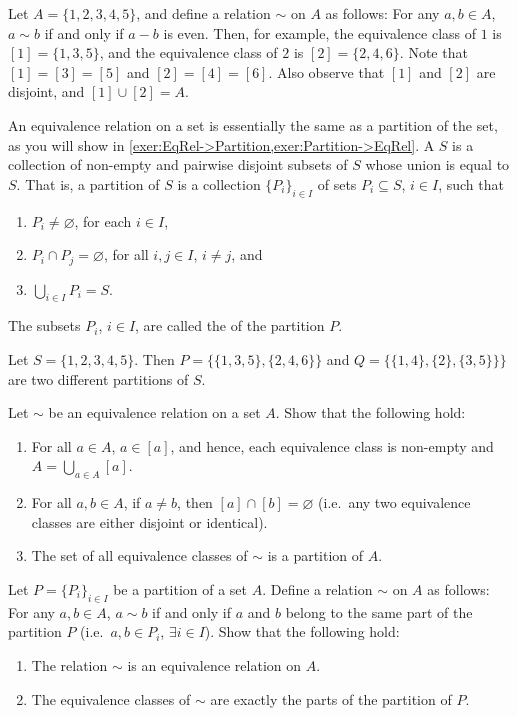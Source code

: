 \begin{Example}
Let $A = \{1, 2, 3, 4, 5\}$, and define a relation $\sim$ on $A$ as follows: For any $a, b \in A$, $a \sim b$ if and only if $a - b$ is even. Then, for example, the equivalence class of $1$ is $[1] = \{1, 3, 5\}$, and the equivalence class of $2$ is $[2] = \{2, 4, 6\}$. Note that $[1] = [3] = [5]$ and $[2] = [4] = [6]$. Also observe that $[1]$ and $[2]$ are disjoint, and $[1] \cup [2] = A$.
\end{Example}

An equivalence relation on a set is essentially the same as a partition of the set, as you will show in \cref{exer:EqRel->Partition,exer:Partition->EqRel}. A  $S$ is a collection of non-empty and pairwise disjoint subsets of $S$ whose union is equal to $S$. That is, a partition of $S$ is a collection $\{P_i\}_{i \in I}$ of sets $P_i \subseteq S$, $i \in I$, such that
\begin{enumerate}
\item $P_i \ne \varnothing$, for each $i \in I$,
\item $P_i \cap P_j = \varnothing$, for all $i, j \in I$, $i \ne j$, and
\item $\bigcup_{i \in I} P_i = S$.
\end{enumerate}
The subsets $P_i$, $i \in I$, are called the  of the partition $P$.

\begin{Example}
Let $S = \{1, 2, 3, 4, 5\}$. Then $P = \{\{1, 3, 5\}, \{2, 4, 6\}\}$ and $Q = \{\{1, 4\}, \{2\}, \{3, 5\}\}\}$ are two different partitions of $S$.
\end{Example}

\begin{Exercise}\label{exer:EqRel->Partition}
Let $\sim$ be an equivalence relation on a set $A$. Show that the following hold:
\begin{enumerate}
\item For all $a \in A$, $a \in [a]$, and hence, each equivalence class is non-empty and $A = \bigcup_{a \in A} [a]$.
\item For all $a, b \in A$, if $a \ne b$, then $[a] \cap [b] = \varnothing$ (i.e.\ any two equivalence classes are either disjoint or identical).
\item The set of all equivalence classes of $\sim$ is a partition of $A$.
\end{enumerate}
\end{Exercise}

\begin{Exercise}\label{exer:Partition->EqRel}
Let $P = \{P_i\}_{i \in I}$ be a partition of a set $A$. Define a relation $\sim$ on $A$ as follows: For any $a, b \in A$, $a \sim b$ if and only if $a$ and $b$ belong to the same part of the partition $P$ (i.e.\ $a, b \in P_i$, $\exists i \in I$). Show that the following hold:
\begin{enumerate}
\item The relation $\sim$ is an equivalence relation on $A$.
\item The equivalence classes of $\sim$ are exactly the parts of the partition of $P$.
\end{enumerate}
\end{Exercise}

